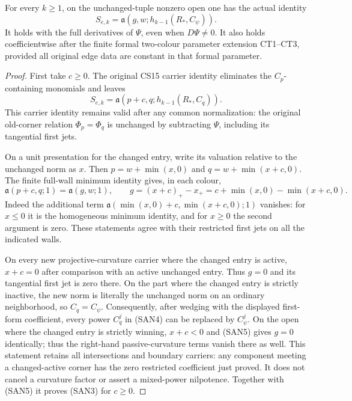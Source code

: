 \begin{lemma}
For every $k\ge1$, on the unchanged-tuple nonzero open one has
the actual identity
\[
 \boxed{\qquad
 S_{e,k}=\mathfrak a(g,w;h_{k-1}(R_*,C_\psi)).
 \qquad}
 \tag{SAN3}
\]
It holds with the full derivatives of $\Psi$, even when $D\Psi\ne0$.
It also holds coefficientwise after the finite formal two-colour
parameter extension CT1--CT3, provided all original edge data are
constant in that formal parameter.
\end{lemma}

\begin{proof}
First take $c\ge0$.  The original CS15 carrier identity eliminates
the $C_p$-containing monomials and leaves
\[
 S_{e,k}=\mathfrak a(p+c,q;h_{k-1}(R_*,C_q)).
 \tag{SAN4}
\]
This carrier identity remains valid after any common normalization:
the original old-corner relation $\Phi_p=\Phi_q$ is unchanged by
subtracting $\Psi$, including its tangential first jets.

On a unit presentation for the changed entry, write its valuation
relative to the unchanged norm as $x$.  Then
$p=w+\min(x,0)$ and $q=w+\min(x+c,0)$.  The finite full-wall
minimum identity gives, in each colour,
\[
 \mathfrak a(p+c,q;1)=\mathfrak a(g,w;1),\qquad
 g=(x+c)_+-x_+=c+\min(x,0)-\min(x+c,0).
 \tag{SAN5}
\]
Indeed the additional term
$\mathfrak a(\min(x,0)+c,\min(x+c,0);1)$ vanishes: for
$x\le0$ it is the homogeneous minimum identity, and for $x\ge0$
the second argument is zero.  These statements agree with their
restricted first jets on all the indicated walls.

On every new projective-curvature carrier where the changed entry
is active, $x+c=0$ after comparison with an active unchanged entry.
Thus $g=0$ and its tangential first jet is zero there.  On the part
where the changed entry is strictly inactive, the new norm is
literally the unchanged norm on an ordinary neighborhood, so
$C_q=C_\psi$.  Consequently, after wedging with the displayed
first-form coefficient, every power $C_q^j$ in (SAN4) can be
replaced by $C_\psi^j$.  On the open where the changed entry is
strictly winning, $x+c<0$ and (SAN5) gives $g=0$ identically;
thus the right-hand passive-curvature terms vanish there as well.
This statement retains all intersections
and boundary carriers: any component meeting a changed-active
corner has the zero restricted coefficient just proved.  It does
not cancel a curvature factor or assert a mixed-power nilpotence.
Together with (SAN5) it proves (SAN3) for $c\ge0$.


\end{proof}
